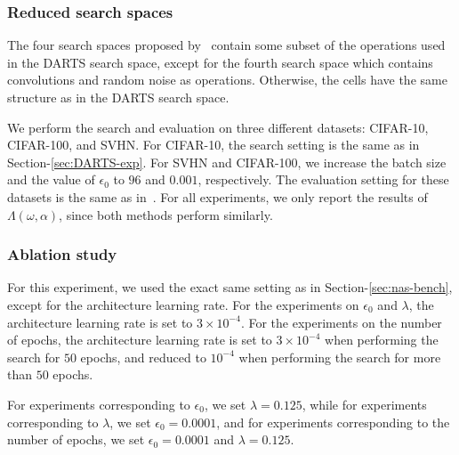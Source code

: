 \documentclass{article} \usepackage{fancyhdr, iclr2023_conference, times}
\begin{document}
 \subsubsection{Reduced search spaces}
 The four search spaces proposed by~\citep{DBLP:conf/iclr/ZelaESMBH20} contain some subset of the operations used in the DARTS search space, except for the fourth search space which contains convolutions and random noise as operations. Otherwise, the cells have the same structure as in the DARTS search space.
\par We perform the search and evaluation on three different datasets: CIFAR-10, CIFAR-100, and SVHN. For CIFAR-10, the search setting is the same as in Section-\ref{sec:DARTS-exp}. For SVHN and CIFAR-100, we increase the batch size and the value of $\epsilon_0$ to $96$ and $0.001$, respectively. The evaluation setting for these datasets is the same as in~\citep{DBLP:conf/iclr/ZelaESMBH20}. For all experiments, we only report the results of $\Lambda(\omega, \alpha)$, since both methods perform similarly.
\subsubsection{Ablation study}
 For this experiment, we used the exact same setting as in Section-\ref{sec:nas-bench}, except for the architecture learning rate. For the experiments on $\epsilon_0$ and $\lambda$, the architecture learning rate is set to $3\times 10^{-4}$. For the experiments on the number of epochs, the architecture learning rate is set to $3\times 10^{-4}$ when performing the search for $50$ epochs, and reduced to $10^{-4}$ when performing the search for more than $50$ epochs.
 \par For experiments corresponding to $\epsilon_0$, we set $\lambda=0.125$, while for experiments corresponding to $\lambda$, we set $\epsilon_0=0.0001$, and for experiments corresponding to the number of epochs, we set $\epsilon_0=0.0001$ and $\lambda=0.125$.
\end{document}
